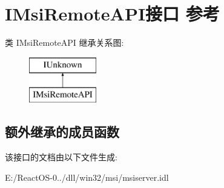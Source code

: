 \hypertarget{interface_i_msi_remote_a_p_i}{}\section{I\+Msi\+Remote\+A\+P\+I接口 参考}
\label{interface_i_msi_remote_a_p_i}
类 I\+Msi\+Remote\+A\+PI 继承关系图\+:\begin{figure}[H]
\begin{center}
\leavevmode
\includegraphics[height=2.000000cm]{interface_i_msi_remote_a_p_i}
\end{center}
\end{figure}
\subsection*{额外继承的成员函数}


该接口的文档由以下文件生成\+:\begin{DoxyCompactItemize}
\item 
E\+:/\+React\+O\+S-\/0../dll/win32/msi/msiserver.\+idl\end{DoxyCompactItemize}
